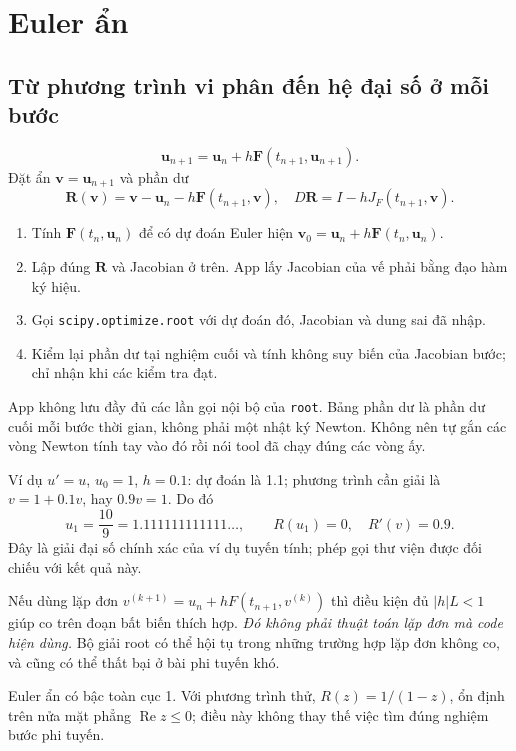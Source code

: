 \section{Euler ẩn}
\label{sec:ode-euler-implicit}
\subsection{Từ phương trình vi phân đến hệ đại số ở mỗi bước}
\[
\mathbf u_{n+1}=\mathbf u_n+h\mathbf F(t_{n+1},\mathbf u_{n+1}).
\]
Đặt ẩn $\mathbf v=\mathbf u_{n+1}$ và phần dư
\[
\mathbf R(\mathbf v)=\mathbf v-\mathbf u_n-h\mathbf F(t_{n+1},\mathbf v),
\quad D\mathbf R=I-hJ_F(t_{n+1},\mathbf v).
\]
\begin{enumerate}
\item Tính $\mathbf F(t_n,\mathbf u_n)$ để có dự đoán Euler hiện $\mathbf v_0=\mathbf u_n+h\mathbf F(t_n,\mathbf u_n)$.
\item Lập đúng $\mathbf R$ và Jacobian ở trên. App lấy Jacobian của vế phải bằng đạo hàm ký hiệu.
\item Gọi \texttt{scipy.optimize.root} với dự đoán đó, Jacobian và dung sai đã nhập.
\item Kiểm lại phần dư tại nghiệm cuối và tính không suy biến của Jacobian bước; chỉ nhận khi các kiểm tra đạt.
\end{enumerate}
App không lưu đầy đủ các lần gọi nội bộ của \texttt{root}. Bảng phần dư là phần dư cuối mỗi bước thời gian, không phải một nhật ký Newton. Không nên tự gắn các vòng Newton tính tay vào đó rồi nói tool đã chạy đúng các vòng ấy.

Ví dụ $u'=u$, $u_0=1$, $h=0.1$: dự đoán là 1.1; phương trình cần giải là $v=1+0.1v$, hay $0.9v=1$. Do đó
\[
u_1=\frac{10}{9}=1.111111111111\ldots,\qquad
R(u_1)=0,\quad R'(v)=0.9.
\]
Đây là giải đại số chính xác của ví dụ tuyến tính; phép gọi thư viện được đối chiếu với kết quả này.

Nếu dùng lặp đơn $v^{(k+1)}=u_n+hF(t_{n+1},v^{(k)})$ thì điều kiện đủ $|h|L<1$ giúp co trên đoạn bất biến thích hợp. \emph{Đó không phải thuật toán lặp đơn mà code hiện dùng.} Bộ giải root có thể hội tụ trong những trường hợp lặp đơn không co, và cũng có thể thất bại ở bài phi tuyến khó.

Euler ẩn có bậc toàn cục 1. Với phương trình thử, $R(z)=1/(1-z)$, ổn định trên nửa mặt phẳng $\operatorname{Re}z\le0$; điều này không thay thế việc tìm đúng nghiệm bước phi tuyến.

